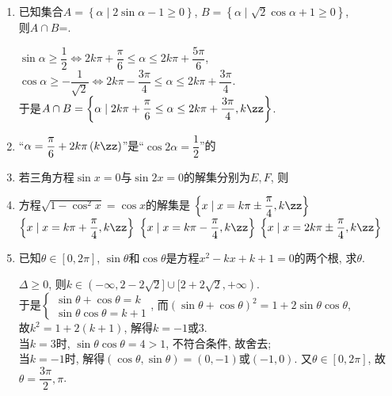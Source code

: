\begin{enumerate}
\item 已知集合$A=\left\{\alpha\mid 2\sin\alpha-1\geq 0\right\}$, $B=\left\{\alpha\mid\sqrt2\cos\alpha+1\geq 0\right\}$, \\
则$A\cap B$=. 
\begin{jieda}
$\sin\alpha\geq\dfrac{1}{2}\iff 2k\pi+\dfrac{\pi}{6}\leq\alpha\leq 2k\pi+\dfrac{5\pi}{6}$, \\
$\cos\alpha\geq-\dfrac{1}{\sqrt{2}}\iff 2k\pi-\dfrac{3\pi}{4}\leq\alpha\leq 2k\pi+\dfrac{3\pi}{4}$. \\
于是$A\cap B=\left\{\alpha\mid 2k\pi+\dfrac{\pi}{6}\leq\alpha\leq 2k\pi+\dfrac{3\pi}{4},k\zz\right\}$. 
\end{jieda}


\item ``$\alpha=\dfrac{\pi}{6}+2k\pi\left(k\zz\right)$''是``$\cos2\alpha=\dfrac{1}{2}$''的


\item 若三角方程$\sin{x}=0$与$\sin2x=0$的解集分别为$E,F$, 则


\item 方程$\sqrt{1-\cos^2x}=\cos{x}$的解集是
\xx
{$\left\{x\mid x=k\pi\pm\dfrac{\pi}{4}, k\zz\right\}$}
{$\left\{x\mid x=k\pi+\dfrac{\pi}{4}, k\zz\right\}$} 
{$\left\{x\mid x=k\pi-\dfrac{\pi}{4}, k\zz\right\}$}
{$\left\{x\mid x=2k\pi\pm\dfrac{\pi}{4}, k\zz\right\}$}


\item 已知$\theta\in[0,2\pi]$, $\sin\theta$和$\cos\theta$是方程$x^2-kx+k+1=0$的两个根, 求$\theta$. 
\begin{jieda}
$\Delta\geq 0$, 则$k\in\left(-\infty,2-2\sqrt{2}]\cup[2+2\sqrt{2},+\infty\right)$. \\
于是$\begin{cases}
\sin\theta+\cos\theta=k\\
\sin\theta\cos\theta=k+1
\end{cases}$, 
而$\left(\sin\theta+\cos\theta\right)^2=1+2\sin\theta\cos\theta$, \\
故$k^2=1+2\left(k+1\right)$, 解得$k=-1$或3. \\
当$k=3$时, $\sin\theta\cos\theta=4>1$, 不符合条件, 故舍去; \\
当$k=-1$时, 解得$\left(\cos\theta,\sin\theta\right)=\left(0,-1\right)$或$\left(-1,0\right)$. 又$\theta\in[0,2\pi]$, 故$\theta=\dfrac{3\pi}{2},\pi$. 
\end{jieda}



\end{enumerate}
